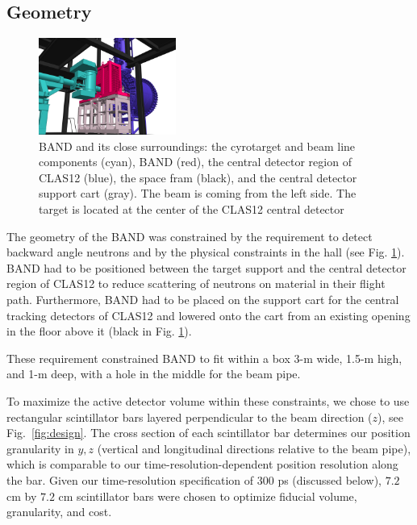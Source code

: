 \documentclass[3p,final,twocolumn]{elsarticle}
\begin{document}
\subsection{Geometry}
\begin{figure}[tb]
	\centering
		\includegraphics[width=0.40\textwidth]{FULL_CONTEXT_STUDIE_3.png}
		\vspace{0.5cm}
		\caption{BAND and its close surroundings: the
                  cyrotarget and beam line components (cyan),  BAND
                  (red), the central detector region of CLAS12
                  (blue), the space fram (black), and the central detector support cart (gray). The beam is coming from the left side. The
                  target is located at the center of the CLAS12 central detector}
		\label{fig:bandtarget}
		
\end{figure}

The geometry of the BAND was constrained by the requirement to detect
backward angle neutrons and by the physical constraints in the hall (see 
Fig. \ref{fig:bandtarget}). BAND had to be positioned between the
target support and the central detector region of CLAS12 to reduce
scattering of neutrons on material in their flight path. Furthermore,
BAND had to be placed on the support cart for the central tracking
detectors of CLAS12 and lowered
onto the cart
from an existing opening in the floor above it (black in
Fig. \ref{fig:bandtarget}).

These requirement constrained BAND to fit within a
box 3-\si{\meter} wide, 1.5-\si{\meter} high, and 1-\si{\meter}
deep, with a hole in the middle for the beam pipe.

To maximize the active detector volume within these constraints, we
chose to use rectangular scintillator bars layered perpendicular to
the beam direction ($z$), see Fig.~\ref{fig:design}.  The cross
section of each scintillator bar determines our position granularity
in $y,z$ (vertical and longitudinal directions relative to the beam
pipe), which is comparable to our time-resolution-dependent position
resolution along the bar. Given our time-resolution specification of
$300$ \si{\pico\second} (discussed below), $7.2$
\si{\centi\meter} by $7.2$ \si{\centi\meter} scintillator bars were
chosen to optimize fiducial volume, granularity, and cost.
\end{document}
